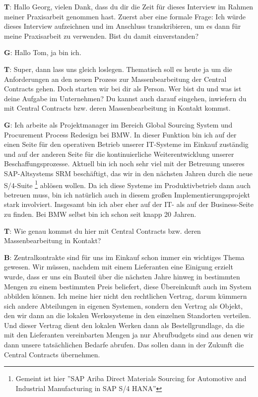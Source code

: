 \begin{list}{X:}{\setlength{\labelsep}{5mm}}
 \linenumbers[1]
 \item[\textbf{T}:] Hallo Georg, vielen Dank, dass du dir die Zeit für dieses Interview im Rahmen meiner Praxisarbeit genommen hast. Zuerst aber eine formale Frage: Ich würde dieses Interview aufzeichnen und im Anschluss transkribieren, um es dann für meine Praxisarbeit zu verwenden. Bist du damit einverstanden?
 \item[\textbf{G}:] Hallo Tom, ja bin ich.
 \item[\textbf{T}:] Super, dann lass uns gleich loslegen. Thematisch soll es heute ja um die Anforderungen an den neuen Prozess zur Massenbearbeitung der Central Contracts gehen. Doch starten wir bei dir als Person. Wer bist du und was ist deine Aufgabe im Unternehmen? Du kannst auch darauf eingehen, inwiefern du mit Central Contracts bzw. deren Massenbearbeitung in Kontakt kommst.
 \item[\textbf{G}:] Ich arbeite als Projektmanager im Bereich Global Sourcing System und Procurement Process Redesign bei BMW. In dieser Funktion bin ich auf der einen Seite für den operativen Betrieb unserer IT-Systeme im Einkauf zuständig und auf der anderen Seite für die kontinuierliche Weiterentwicklung unserer Beschaffungsprozesse. Aktuell bin ich noch sehr viel mit der Betreuung unseres SAP-Altsystems SRM beschäftigt, das wir in den nächsten Jahren durch die neue S/4-Suite \footnote{Gemeint ist hier ''SAP Ariba Direct Materials Sourcing for Automotive and Industrial Manufacturing in SAP S/4 HANA''} ablösen wollen. Da ich diese Systeme im Produktivbetrieb dann auch betreuen muss,  bin ich natürlich auch in diesem gro\ss en Implementierungsprojekt stark involviert. Insgesamt bin ich aber eher auf der IT- als auf der Business-Seite zu finden. Bei BMW selbst bin ich schon seit knapp 20 Jahren.
 \item[\textbf{T}:] Wie genau kommst du hier mit Central Contracts bzw. deren Massenbearbeitung in Kontakt?
 \item[\textbf{B}:] Zentralkontrakte sind für uns im Einkauf schon immer ein wichtiges Thema gewesen. Wir müssen, nachdem mit einem Lieferanten eine Einigung erzielt wurde, dass er uns ein Bauteil über die nächsten Jahre hinweg in bestimmten Mengen zu einem bestimmten Preis beliefert, diese Übereinkunft auch im System abbilden können. Ich meine hier nicht den rechtlichen Vertrag, darum kümmern sich andere Abteilungen in eigenen Systemen, sondern den Vertrag als Objekt, den wir dann an die lokalen Werkssysteme in den einzelnen Standorten verteilen. Und dieser Vertrag dient den lokalen Werken dann als Bestellgrundlage, da die mit den Lieferanten vereinbarten Mengen ja nur Abrufbudgets sind aus denen wir dann unsere tatsächlichen Bedarfe abrufen. Das sollen dann in der Zukunft die Central Contracts übernehmen.

\end{list}
